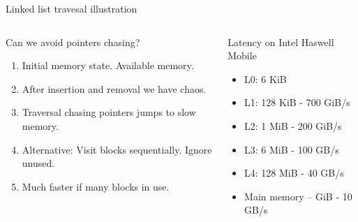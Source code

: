 \documentclass[10pt,aspectratio=169]{beamer}
\def\nodeQ{\node[style=nodeQ]}
\begin{document}
\begin{frame}[fragile]{Linked list travesal illustration}
\begin{columns}
\begin{column}{0.6\textwidth}
Can we avoid pointers chasing?
\begin{enumerate}
\item<alert@1> Initial memory state. Available memory.
\item<alert@2> After insertion and removal we have chaos.
\item<alert@3> Traversal chasing pointers jumps to slow memory.
\item<alert@4> Alternative: Visit blocks sequentially. Ignore unused.
\item<alert@4> Much faster if many blocks in use.
\end{enumerate}
\end{column}
\begin{column}{0.4\textwidth}
Latency on Intel Haswell Mobile 
\begin{itemize}
    \item<alert@3> L0: 6 KiB
    \item<alert@3> L1: 128 KiB - 700 GiB/s
    \item<alert@3> L2: 1 MiB - 200 GiB/s
    \item<alert@3> L3: 6 MiB - 100 GB/s
    \item<alert@3> L4: 128 MiB - 40 GB/s
    \item<alert@3> Main memory – GiB - 10 GB/s
\end{itemize}

\end{column}
\end{columns}

\end{frame}
\end{document}
